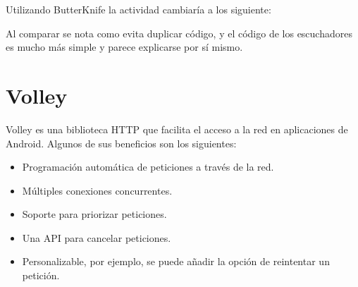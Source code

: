 Utilizando ButterKnife la actividad cambiaría a los siguiente:

%
\begin{sphinxVerbatim}[commandchars=\\\{\}]
     
   

      

     

\end{sphinxVerbatim}

Al comparar se nota como evita duplicar código, y el código de los escuchadores
es mucho más simple y parece explicarse por sí mismo.


\section*{ Volley}
\label{\detokenize{dev_docs:volley}}
Volley es una biblioteca HTTP que facilita el acceso a la red en aplicaciones
de Android. Algunos de sus beneficios son los siguientes:
\begin{itemize}
\item {} 
Programación automática de peticiones a través de la red.

\item {} 
Múltiples conexiones concurrentes.

\item {} 
Soporte para priorizar peticiones.

\item {} 
Una API para cancelar peticiones.

\item {} 
Personalizable, por ejemplo, se puede añadir la opción de reintentar un petición.

\end{itemize}


